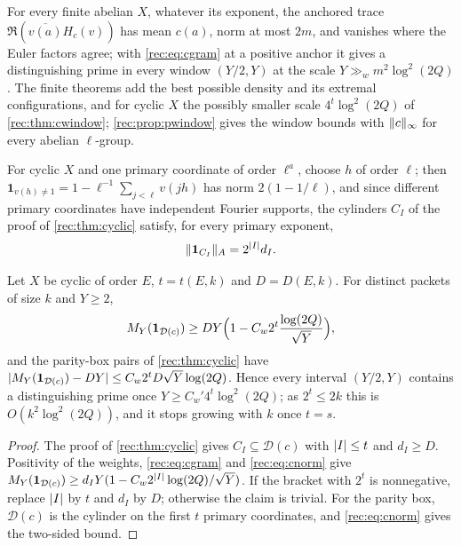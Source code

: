 \begin{remark}\label{rec:rem:cscale}
For every finite abelian $X$, whatever its exponent, the anchored trace $\Re(\overline{v(a)}H_c(v))$ has mean $c(a)$, norm
at most $2m$, and vanishes where the Euler factors agree; with \eqref{rec:eq:cgram} at a positive anchor it gives
a distinguishing prime in every window $(Y/2,Y)$ at the scale $Y\gg_wm^2\log^2(2Q)$. The finite theorems add the
best possible density and its extremal configurations, and for cyclic $X$ the possibly smaller scale
$4^t\log^2(2Q)$ of \cref{rec:thm:cwindow}; \cref{rec:prop:pwindow} gives the window bounds with $\lVert c\rVert_\infty$ for every
abelian $\ell$-group.
\end{remark}

For cyclic $X$ and one primary
coordinate of order $\ell^a$, choose $h$ of order $\ell$; then $\mathbf 1_{v(h)\ne1}=1-\ell^{-1}\sum_{j<\ell}v(jh)$ has norm $2(1-1/\ell)$, and since
different primary coordinates have independent Fourier supports, the cylinders $C_I$ of the proof of
\cref{rec:thm:cyclic} satisfy, for every primary exponent,
\begin{equation}\label{rec:eq:cnorm}
 \lVert\mathbf 1_{C_I}\rVert_A=2^{\lvert I\rvert}d_I.
\end{equation}

\begin{theorem}\label{rec:thm:cwindow}
Let $X$ be cyclic of order $E$, $t=t(E,k)$ and $D=D(E,k)$. For distinct packets of size $k$ and $Y\ge2$,
\[
 M_Y(\mathbf 1_{\mathcal D(c)})\ge DY\Bigl(1-C_w2^t\frac{\log(2Q)}{\sqrt Y}\Bigr),
\]
and the parity-box pairs of \cref{rec:thm:cyclic} have $\lvert M_Y(\mathbf 1_{\mathcal D(c)})-DY\rvert\le C_w2^tD\sqrt Y\log(2Q)$. Hence every interval
$(Y/2,Y)$ contains a distinguishing prime once $Y\ge C_w'4^t\log^2(2Q)$; as $2^t\le2k$ this is $O(k^2\log^2(2Q))$, and it stops
growing with $k$ once $t=s$.
\end{theorem}

\begin{proof}
The proof of \cref{rec:thm:cyclic} gives $C_I\subseteq\mathcal D(c)$ with $\lvert I\rvert\le t$ and $d_I\ge D$. Positivity of the weights,
\eqref{rec:eq:cgram} and \eqref{rec:eq:cnorm} give $M_Y(\mathbf 1_{\mathcal D(c)})\ge d_IY(1-C_w2^{\lvert I\rvert}\log(2Q)/\sqrt Y)$. If the bracket with $2^t$ is
nonnegative, replace $\lvert I\rvert$ by $t$ and $d_I$ by $D$; otherwise the claim is trivial. For the parity box, $\mathcal D(c)$ is the
cylinder on the first $t$ primary coordinates, and \eqref{rec:eq:cnorm} gives the two-sided bound.
\end{proof}


